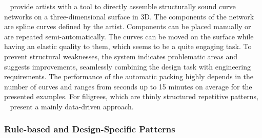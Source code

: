 \citeauthor*{zehnder_2016_dso}~\cite{zehnder_2016_dso} provide artists with a tool to directly assemble structurally sound curve networks on a three-dimensional surface in 3D. The components of the network are spline curves defined by the artist. Components can be placed manually or are repeated semi-automatically. The curves can be moved on the surface while having an elastic quality to them, which seems to be a quite engaging task. To prevent structural weaknesses, the system indicates problematic areas and suggests improvements, seamlessly combining the design task with engineering requirements. The performance of the automatic packing highly depends in the number of curves and ranges from seconds up to 15 minutes on average for the presented examples. For filigrees, which are thinly structured repetitive patterns, \citeauthor*{chen_2016_sof}~\cite{chen_2016_sof} present a mainly data-driven approach. 




\subsubsection{Rule-based and Design-Specific Patterns}
\label{subsubsec:analysis_rulebased_and_designspecific}

